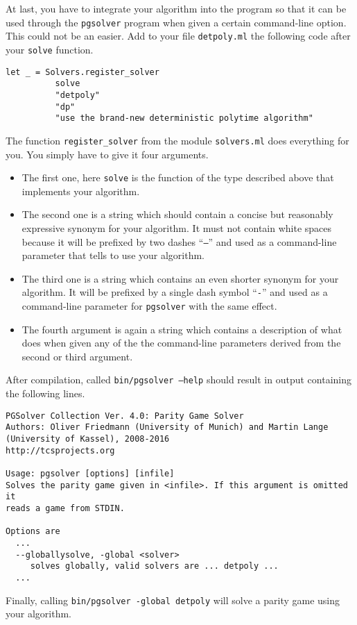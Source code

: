 At last, you have to integrate your algorithm into the program so that it can be used through the
\texttt{pgsolver} program when given a certain command-line option. This could not be an easier. Add to
your file \texttt{detpoly.ml} the following code after your \texttt{solve} function.
\begin{verbatim}
let _ = Solvers.register_solver
          solve
          "detpoly"
          "dp"
          "use the brand-new deterministic polytime algorithm"
\end{verbatim}
The function \texttt{register\_solver} from the module \texttt{solvers.ml} does everything for you. You
simply have to give it four arguments.
\begin{itemize}
\item The first one, here \texttt{solve} is the function of the type described above that implements
      your algorithm.
\item The second one is a string which should contain a concise but reasonably expressive synonym for your
      algorithm. It must not contain white spaces because it will be prefixed by two dashes ``\texttt{--}''
      and used as a command-line parameter that tells \pgsolver to use your algorithm.
\item The third one is a string which contains an even shorter synonym for your algorithm. It will be
      prefixed by a single dash symbol ``\texttt{-}'' and used as a command-line parameter for \texttt{pgsolver}
      with the same effect.
\item The fourth argument is again a string which contains a description of what \pgsolver does
      when given any of the the command-line parameters derived from the second or third argument.
\end{itemize}
After compilation, called \texttt{bin/pgsolver --help} should result in output containing the following
lines.
\begin{verbatim}
PGSolver Collection Ver. 4.0: Parity Game Solver
Authors: Oliver Friedmann (University of Munich) and Martin Lange (University of Kassel), 2008-2016
http://tcsprojects.org

Usage: pgsolver [options] [infile]
Solves the parity game given in <infile>. If this argument is omitted it
reads a game from STDIN.

Options are
  ...
  --globallysolve, -global <solver>
     solves globally, valid solvers are ... detpoly ...
  ...
\end{verbatim}
Finally, calling \texttt{bin/pgsolver -global detpoly} will solve a parity game using your algorithm.



